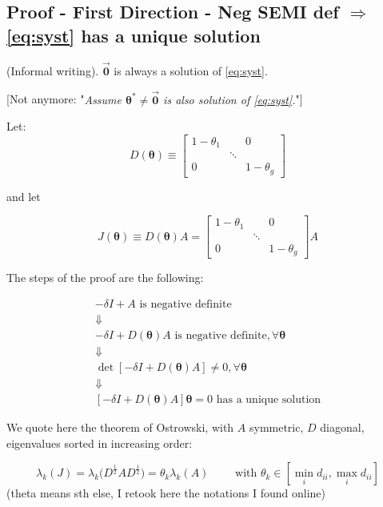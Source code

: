 \documentclass[12pt]{article}
\begin{document}
\subsection{Proof - First Direction - Neg SEMI def $\Rightarrow$ \eqref{eq:syst} has a unique solution}

(Informal writing). $\bm{\vec{0}}$ is always a solution of \eqref{eq:syst}. 

[Not anymore: "\textit{Assume $\bm{\theta^{*}} \neq \bm{\vec{0}}$ is also solution of \eqref{eq:syst}.}"]

Let:
\[ D(\bm{\theta}) \equiv \begin{bmatrix} 1- \theta_1 & & 0 \\  & \ddots & \\ 0 & & 1-\theta_g \end{bmatrix} \]

and let 

\[J(\bm{\theta}) \equiv D(\bm{\theta}) A = \begin{bmatrix} 1- \theta_1 & & 0 \\  & \ddots & \\ 0 & & 1-\theta_g \end{bmatrix}  A \]

\begin{framed}
The steps of the proof are the following:

\[ \begin{array}{c}
-\delta I + A \text{ is negative definite} \\
\Downarrow \\
-\delta I + D(\bm{\theta}) A \text{ is negative definite} , \forall \bm{\theta} \\ 
\Downarrow \\
\det \left[-\delta I + D(\bm{\theta}) A \right] \neq 0  , \forall \bm{\theta} \\
\Downarrow \\
\left[-\delta I + D(\bm{\theta}) A \right] \bm{\theta} = 0 \text{ has a unique solution} 
\end{array} \]
\end{framed}

We quote here the theorem of Ostrowski, with $A$ symmetric, $D$ diagonal, eigenvalues sorted in increasing order:

\[ \lambda_k(J) = \lambda_k \Big( D^{\frac{1}{2}} A  D^{\frac{1}{2}} \Big) = \theta_k \lambda_k(A) \qquad \text{ with } \theta_k \in \left[ \min_i d_{ii}, \max_i d_{ii} \right] \] (theta means sth else, I retook here the notations I found online)
\end{document}
